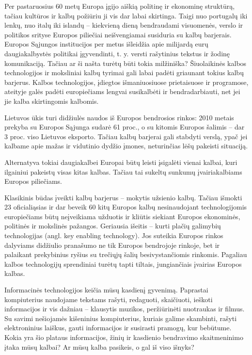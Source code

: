 \begin{multicols}{2}
Per pastaruosius 60 metų Europa įgijo aiškią politinę ir ekonominę struktūrą, tačiau kultūros ir kalbų požiūriu ji vis dar labai skirtinga. Taigi nuo portugalų iki lenkų, nuo italų iki islandų – kiekvieną dieną bendraudami visuomenės, verslo ir politikos srityse Europos piliečiai neišvengiamai susiduria su kalbų barjerais. Europos Sąjungos institucijos per metus išleidžia apie milijardą eurų daugiakalbystės politikai įgyvendinti, t. y. versti rašytinius tekstus ir žodinę komunikaciją. Tačiau ar ši našta turėtų būti tokia milžiniška? Šiuolaikinės kalbos technologijos ir moksliniai kalbų tyrimai gali labai padėti griaunant tokius kalbų barjerus. Kalbos technologijos, įdiegtos išmaniuosiuose prietaisuose ir programose, ateityje galės padėti europiečiams lengvai susikalbėti ir bendradarbiauti, net jei jie kalba skirtingomis kalbomis.

Lietuvos ūkis turi didžiulės naudos iš Europos bendrosios rinkos: 2010 metais prekyba su Europos Sąjunga sudarė 61 proc., o su kitomis Europos šalimis – dar 3 proc. viso Lietuvos eksporto. Tačiau kalbų barjerai gali stabdyti verslą, ypač jei kalbame apie mažas ir vidutinio dydžio įmones, neturinčias lėšų pakeisti situaciją. 

Alternatyva tokiai daugiakalbei Europai būtų leisti įsigalėti vienai kalbai, kuri ilgainiui pakeistų visas kitas kalbas. Tačiau tai sukeltų sunkumų įvairiakalbiams Europos piliečiams. 

Klasikinis būdas įveikti kalbų barjerus – mokytis užsienio kalbų. Tačiau išmokti 23 oficialiąsias ir dar beveik 60 kitų Europos kalbų nesinaudojant technologijomis europiečiams būtų neįveikiama užduotis ir kliūtis siekiant Europos ekonominės, politinės ir mokslinės pažangos.
Geriausia išeitis – kurti plačių galimybių technologijas (angl. key enabling technology). Jos suteikia Europos rinkos dalyviams didžiulio pranašumo ne tik Europos bendrojoje rinkoje, bet ir palaikant prekybinius ryšius su trečiųjų šalių besivystančiomis rinkomis. Pagaliau kalbos technologijų sprendiniai turėtų tapti tiltais, jungiančiais įvairias Europos kalbas. 


Informacinės technologijos keičia mūsų kasdienį gyvenimą. Paprastai kompiuterius naudojame tekstams rašyti, redaguoti, skaičiuoti, ieškoti informacijos ir vis dažniau – klausytis muzikos, peržiūrinėti nuotraukas ir filmus. Su savimi nešiojamės kišeninius kompiuterius, kuriais galime skambinti, rašyti elektroninius laiškus, gauti informacijos ir susirasti pramogų, kur bebūtume. Kokia yra šio plataus informacijos, žinių ir kasdienio bendravimo skaitmeninimo įtaka mūsų kalbai? Ar mūsų kalba pasikeis, o gal iš viso išnyks? 


\end{multicols}

